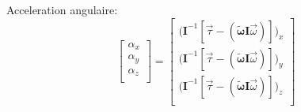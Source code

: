 \documentclass{article}
\begin{document}
Acceleration angulaire:
\begin{equation}
    \begin{bmatrix}
        \alpha_x \\
        \alpha_y \\
        \alpha_z \\
    \end{bmatrix}
=
\begin{bmatrix}
    \lparen\boldsymbol{I}^{-1}[\vec{\tau} - (\boldsymbol{\tilde{\omega}}\boldsymbol{I}\vec{\omega})]\rparen_x \\
    \lparen\boldsymbol{I}^{-1}[\vec{\tau} - (\boldsymbol{\tilde{\omega}}\boldsymbol{I}\vec{\omega})]\rparen_y \\
    \lparen\boldsymbol{I}^{-1}[\vec{\tau} - (\boldsymbol{\tilde{\omega}}\boldsymbol{I}\vec{\omega})]\rparen_z \\
\end{bmatrix}
\end{equation}
\end{document}
